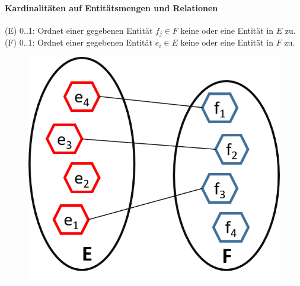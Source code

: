 \begin{frame}{\insertsection}
\framesubtitle{Kardinalitäten auf Entit\"atsmengen und Relationen}
  \newline 
  (E) 0..1: Ordnet einer gegebenen Entit\"at $f_j \in F$ keine oder eine Entit\"at in $E$ zu. 
\newline 
  (F) 0..1: Ordnet einer gegebenen Entit\"at $e_i \in E$ keine oder eine Entit\"at in $F$ zu. 
 \begin{figure}
	\includegraphics[scale=0.5]{img/ERM-1-1-Relation.png}
 \end{figure}
\end{frame}

